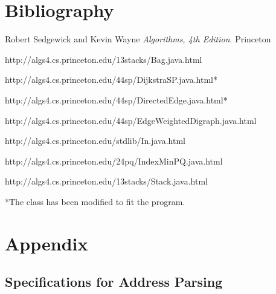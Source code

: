 \documentclass[a4paper,10pt,titlepage]{article}
\begin{document}
	\newpage	
	
	\section{Bibliography}
	
	\begin{thebibliography}{9}

  	Robert Sedgewick and Kevin Wayne
  	\emph{Algorithms, 4th Edition}.
  	Princeton

	http://algs4.cs.princeton.edu/13stacks/Bag.java.html
	
	http://algs4.cs.princeton.edu/44sp/DijkstraSP.java.html*  	
	
	http://algs4.cs.princeton.edu/44sp/DirectedEdge.java.html*
	
	http://algs4.cs.princeton.edu/44sp/EdgeWeightedDigraph.java.html
  	
	http://algs4.cs.princeton.edu/stdlib/In.java.html
	
	http://algs4.cs.princeton.edu/24pq/IndexMinPQ.java.html
	
	 												http://algs4.cs.princeton.edu/13stacks/Stack.java.html
	
	\end{thebibliography}
	*The class has been modified to fit the program.

	\newpage

	\section{Appendix}

	\subsection{Specifications for Address Parsing}
\end{document}
